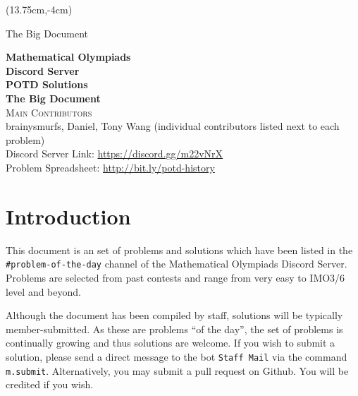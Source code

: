 \documentclass[10pt]{article}
\newcommand{\theissue}{The Big Document}
\newcounter{day}
\newcounter{solution}
\begin{document}
	\begin{titlepage}
		\begin{textblock*}{2cm}(13.75cm,-4cm) \begin{flushright}\theissue \end{flushright} \end{textblock*}
		\begin{center}
			\LARGE\textbf{Mathematical Olympiads\\Discord Server}\\
			\Huge\textbf{POTD Solutions}\\
			\Large\textbf{\theissue}\\
			\Large\textsc{Main Contributors}\\
			\normalsize{brainysmurfs, Daniel, Tony Wang (individual contributors listed next to each problem)}\\
			Discord Server Link: \url{https://discord.gg/m22vNrX}\\
			Problem Spreadsheet: \url{http://bit.ly/potd-history}\\
		\end{center}
	\end{titlepage}
\section{Introduction}

This document is an set of problems and solutions which have been listed in the \texttt{\#problem-of-the-day} channel of the Mathematical Olympiads Discord Server. Problems are selected from past contests and range from very easy to IMO3/6 level and beyond.

Although the document has been compiled by staff, solutions will be typically member-submitted. As these are problems ``of the day'', the set of problems is continually growing and thus solutions are welcome. If you wish to submit a solution, please send a direct message to the bot \texttt{Staff Mail} via the command \texttt{m.submit}. Alternatively, you may submit a pull request on Github. You will be credited if you wish.
\end{document}
